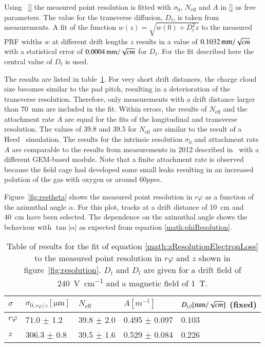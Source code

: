 \documentclass[preprint]{elsarticle}
\begin{document}
Using ~\eqref{} the measured point resolution is fitted
with $\sigma_{0}$, $N_{\mathrm{eff}}$ and $A$ in \eqref{} as free parameters. The value for the transverse diffusion, $D_t$, is taken from measurements. A fit of the function $w(z) = \sqrt{w(0) + D_t^2 z}$ to the measured PRF widths $w$ at different drift lengths $z$ results in a value of $\SI[per-mode=symbol]{0.1032}{\mm \per \sqrt{\cm}}$ with a statistical error of $\SI[per-mode=symbol]{0.0004}{\mm \per \sqrt{\cm}}$ for $D_{t}$. For 
the fit described here 
the central value of $D_t$ is used.

 The results are listed in table~\ref{tab:res}. For very short drift distances, the charge cloud size becomes similar to the pad pitch, resulting in a deterioration of the transverse resolution. Therefore, only measurements with a drift distance larger than \SI{70}{\mm} are included in the fit. 
Within errors, the results of $N_{\mathrm{eff}}$ and the attachment rate $A$ are equal for the fits of the longitudinal and transverse resolution.
The values of 39.8 and 39.5 for $N_{\mathrm{eff}}$ are similar to the result of a Heed~\cite{Heed} 
simulation. The results for the intrinsic resolution $\sigma_0$ and attachment rate $A$ are comparable to the results from measurements in 2012 described in~\cite{Kato:2014uha} with a different GEM-based module. Note that a finite attachment rate is observed because the field cage had developed some small leaks resulting in an increased polution of the gas with oxygen or around $60 ppm$.

Figure~\ref{fig:restheta} shows the measured point resolution in $r\varphi$ as a function of the azimuthal angle $\alpha$. For this plot, tracks at a drift distance of \SI{10}{\cm} and \SI{40}{\cm} have been selected. The dependence on the azimuthal angle shows the behaviour with $\tan \lvert \alpha \rvert$ as expected from equation \eqref{math:phiResolution}.

\begin{table}[bt]
\centering
\begin{tabular}{l|l|l|l|l}
\hline
$\sigma$ & $\sigma_{0,r\varphi / z} [\si{\um}] $ & $N_{\mathrm{eff}}$ & $A [\si{m^{-1}}]$ & $D_{t/l} [\si[per-mode=symbol]{\mm \per \sqrt{\cm}}]$ (fixed) \\
\hline
$r\varphi$ &  71.0 $\pm$ 1.2 & 39.8 $\pm$ 2.0 & 0.495 $\pm$ 0.097 & 0.103 \\
$z$     & 306.3 $\pm$ 0.8 & 39.5 $\pm$ 1.6 & 0.529 $\pm$ 0.084 & 0.226\\
\hline
\end{tabular}
\caption{\small \label{tab:res} Table of results for the fit of equation \eqref{math:zResolutionElectronLoss} to the measured point resolution in $r\varphi$ and $z$ shown in figure~\ref{fig:resolution}. $D_t$ and $D_l$ are given for a drift field of \SI[per-mode=symbol]{240}{\V\per\cm} and a magnetic field of \SI{1}{\tesla}.}
\end{table}
\end{document}
